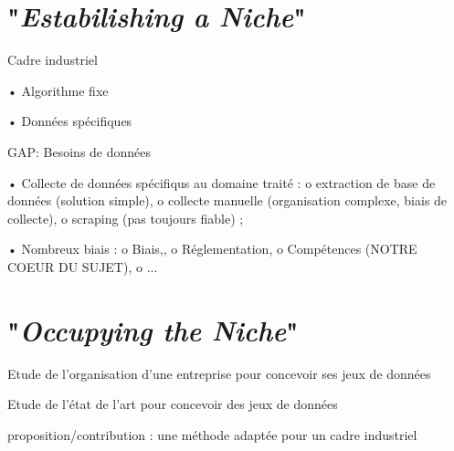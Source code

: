 	
	\section{"\textit{Estabilishing a Niche}"}

    \begin{todolist}

        \item Cadre industriel

            •	Algorithme fixe

            •	Données spécifiques

        \item GAP: Besoins de données

            •	Collecte de données spécifiqus au domaine traité :
                o   extraction de base de données (solution simple),
                o   collecte manuelle (organisation complexe, biais de collecte),
                o   scraping (pas toujours fiable) ;

            •	Nombreux biais :
                o   Biais,,
                o   Réglementation,
                o   Compétences (NOTRE COEUR DU SUJET),
                o   ...
    \end{todolist}

	
	\section{"\textit{Occupying the Niche}"}

    \begin{todolist}
        \item Etude de l'organisation d'une entreprise pour concevoir ses jeux de données
        \item Etude de l'état de l'art pour concevoir des jeux de données
        \item proposition/contribution : une méthode adaptée pour un cadre industriel
    \end{todolist}